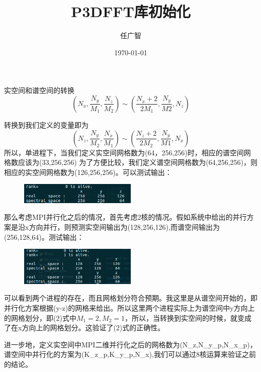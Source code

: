 \documentclass[11pt,a4paper]{article}
\title{P3DFFT库初始化}
\author{任广智}
\date{\today}
\begin{document}
	
\maketitle


实空间和谱空间的转换
\begin{equation}
	(N_x,\frac{N_y}{M_1},\frac{N_z}{M_2}) \sim (\frac{N_x+2}{2M_1},\frac{N_y}{M2},N_z) 
\end{equation}

转换到我们定义的变量即为
\begin{equation}
	(N_z,\frac{N_y}{M_2},\frac{N_x}{M_1}) \sim (\frac{N_z+2}{2M_2},\frac{N_y}{M1},N_x)
\end{equation}
所以，单进程下，当我们定义实空间网格数为(64，256,256)时，相应的谱空间网格数应该为(33,256,256)
为了方便比较，我们定义谱空间网格数为(64,256,256)，则相应的实空间网格数为(126,256,256)。可以测试输出：
\begin{figure}[H]
	\centering
	\includegraphics[width=0.5\textwidth]{./fig1.png}
	\caption{}
\end{figure}

那么考虑MPI并行化之后的情况，首先考虑2核的情况。假如系统中给出的并行方案是沿x方向并行，则预测实空间输出为(128,256,126),而谱空间输出为(256,128,64)。测试输出：
\begin{figure}[H]
	\centering
	\includegraphics[width=0.5\textwidth]{./fig2.png}
	\caption{}
\end{figure}
可以看到两个进程的存在，而且网格划分符合预期。我这里是从谱空间开始的，即并行化方案根据(y-z)的网格来给出。所以这里两个进程实际上为谱空间中y方向上的网格划分，即(2)式中$M_1=2,M_2=1$，所以，当转换到实空间的时候，就变成了在x方向上的网格划分。这验证了(2)式的正确性。

进一步地，定义实空间中MPI二维并行化之后的网格数为(N_z,N_y_p,N_x_p)，谱空间中并行化的方案为(K_z_p,K_y_p,N_x),我们可以通过8核运算来验证之前的结论。
\end{document}
